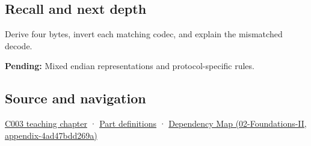 \subsection{Recall and next depth}\label{recall-and-next-depth}

Derive four bytes, invert each matching codec, and explain the mismatched decode.

\textbf{Pending:} Mixed endian representations and protocol-specific rules.

\subsection{Source and navigation}\label{source-and-navigation}

\href{Continuous\%20Notes/Computing\%20Foundations\%20-\%20From\%20Bits\%20to\%20C++\%20and\%20Systems\%20APIs\#Where\%20the\%20bytes\%20live}{C003 teaching chapter} · \hyperref[appendix-fd090d982a15]{Part definitions} · \href{}{Dependency Map (02-Foundations-II, appendix-4ad47bdd269a)}
